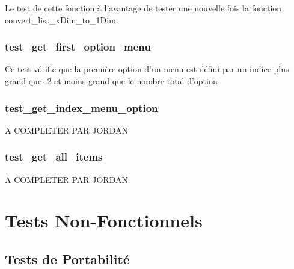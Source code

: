 \documentclass[16pts]{report}
\begin{document}
Le test de cette fonction à l'avantage de tester une nouvelle fois la 
fonction convert_list_xDim_to_1Dim.\\

\subsubsection{test_get_first_option_menu}

Ce test vérifie que la première option d'un menu est défini par un indice
plus grand que -2 et moins grand que le nombre total d'option\\

\subsubsection{test_get_index_menu_option}

A COMPLETER PAR JORDAN

\subsubsection{test_get_all_items}

A COMPLETER PAR JORDAN

\section{Tests Non-Fonctionnels}



\subsection{Tests de Portabilité}
\end{document}
